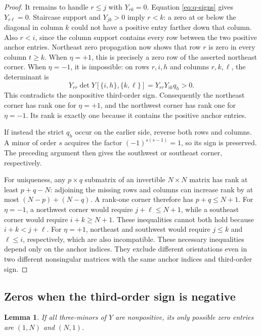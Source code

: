 \documentclass[11pt]{article}
\newtheorem{lemma}[theorem]{Lemma}
\theoremstyle{definition}
\theoremstyle{remark}
\numberwithin{equation}{section}
\begin{document}
\begin{proof}
It remains to handle $r\leq j$ with $Y_{rk}=0$. Equation
\eqref{eq:q-signs} gives $Y_{r\ell}=0$. Staircase support and
$Y_{jk}>0$ imply $r<k$: a zero at or below the diagonal in column
$k$ could not have a positive entry farther down that column.
Also $r<i$, since the column support contains every row between the
two positive anchor entries. Northeast zero propagation now shows
that row $r$ is zero in every column $t\geq k$. When $\eta=+1$,
this is precisely a zero row of the asserted northeast corner.
When $\eta=-1$, it is impossible: on rows $r,i,h$ and columns
$r,k,\ell$, the determinant is
\[
 Y_{rr}\det Y[\{i,h\},\{k,\ell\}]
 =Y_{rr}Y_{ik}q_h>0.
\]
This contradicts the nonpositive third-order sign.
Consequently the northeast corner has rank one for $\eta=+1$, and
the northwest corner has rank one for $\eta=-1$. Its rank is exactly
one because it contains the positive anchor entries.

If instead the strict $q_h$ occur on the earlier side, reverse both
rows and columns. A minor of order $s$ acquires the factor
$(-1)^{s(s-1)}=1$, so its sign is preserved. The preceding argument
then gives the southwest or southeast corner, respectively.

For uniqueness, any $p\times q$ submatrix of an invertible
$N\times N$ matrix has rank at least $p+q-N$: adjoining the missing
rows and columns can increase rank by at most $(N-p)+(N-q)$.
A rank-one corner therefore has $p+q\leq N+1$. For $\eta=-1$,
a northwest corner would require $j+\ell\leq N+1$, while a southeast
corner would require $i+k\geq N+1$. These inequalities cannot both
hold because $i+k<j+\ell$. For $\eta=+1$, northeast and southwest
would require $j\leq k$ and $\ell\leq i$, respectively, which are
also incompatible. These necessary inequalities depend only on the
anchor indices. They exclude different orientations even in two
different nonsingular matrices with the same anchor indices and
third-order sign.
\end{proof}

\subsection{Zeros when the third-order sign is negative}

\begin{lemma}\label{lem:twozeros}
If all three-minors of $Y$ are nonpositive, its only possible zero
entries are $(1,N)$ and $(N,1)$.
\end{lemma}
\end{document}
